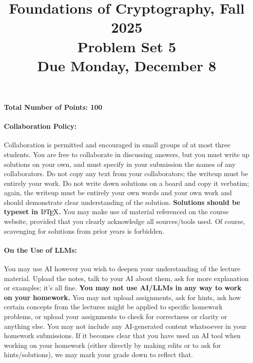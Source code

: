 \documentclass{article}
\title{Foundations of Cryptography, Fall 2025 \\ Problem Set 5 \\ Due Monday, December 8}
\date{}
\author{}
\begin{document}
\maketitle

\paragraph{Total Number of Points: 100}

\paragraph{Collaboration Policy:} Collaboration is permitted and encouraged in small groups of at most three students. You are free to collaborate in discussing answers, but you must write up solutions on your own, and must specify in your submission the names of any collaborators. Do not copy any text from your collaborators; the writeup must be entirely your work. Do not write down solutions on a board and copy it verbatim; again, the writeup must be entirely your own words and your own work and should demonstrate clear understanding of the solution. \textbf{Solutions should be typeset in $\text{\LaTeX}$.} You may make use of material referenced on the course website, provided that you clearly acknowledge all sources/tools used. Of course, scavenging for solutions from prior years is forbidden.

\paragraph{On the Use of LLMs:} You may use AI however you wish to deepen your understanding of the lecture material. Upload the notes, talk to your AI about them, ask for more explanation or examples; it's all fine. \textbf{You may not use AI/LLMs in any way to work on your homework.} You may not upload assignments, ask for hints, ask how certain concepts from the lectures might be applied to specific homework problems, or upload your assignments to check for correctness or clarity or anything else. You may not include any AI-generated content whatsoever in your homework submissions. If it becomes clear that you have used an AI tool when working on your homework (either directly by making edits or to ask for hints/solutions), we may mark your grade down to reflect that.

\newpage
\end{document}
